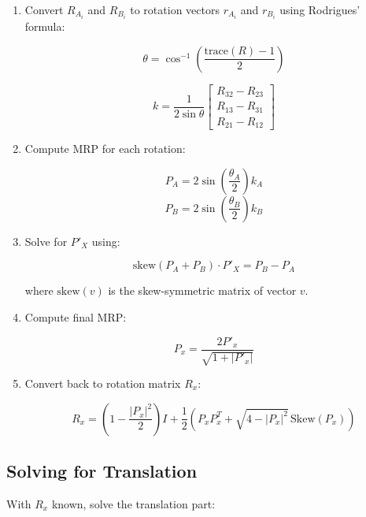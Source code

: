 \documentclass{article}
\begin{document}
\begin{enumerate}
\item Convert $R_{A_i}$ and $R_{B_i}$ to rotation vectors $r_{A_i}$ and $r_{B_i}$ using Rodrigues' formula:

\begin{equation}
\theta = \cos^{-1} \left( \frac{\text{trace}(R) - 1}{2} \right)
\end{equation}

\begin{equation}
k = \frac{1}{2 \sin \theta} \begin{bmatrix} R_{32} - R_{23} \\ R_{13} - R_{31} \\ R_{21} - R_{12} \end{bmatrix}
\end{equation}

\item Compute MRP for each rotation:

\begin{equation}
P_A = 2 \sin\left(\frac{\theta_A}{2}\right) k_A
\end{equation}
\begin{equation}
P_B = 2 \sin\left(\frac{\theta_B}{2}\right) k_B
\end{equation}

\item Solve for $P'_X$ using:

\begin{equation}
\text{skew}(P_A + P_B) \cdot P'_X = P_B - P_A
\end{equation}

where $\text{skew}(v)$ is the skew-symmetric matrix of vector $v$.

\item Compute final MRP:

\begin{equation}
P_x = \frac{2P'_x}{\sqrt{1 + |P'_x|}}
\end{equation}

\item Convert back to rotation matrix $R_x$:

\begin{equation}
R_x = \left( 1 - \frac{|P_x|^2}{2} \right) I + \frac{1}{2} \left( P_x P^T_x + \sqrt{4 - |P_x|^2} \, \text{Skew}(P_x) \right)
\end{equation}
\end{enumerate}

\subsection{Solving for Translation}
With $R_x$ known, solve the translation part:
\end{document}
